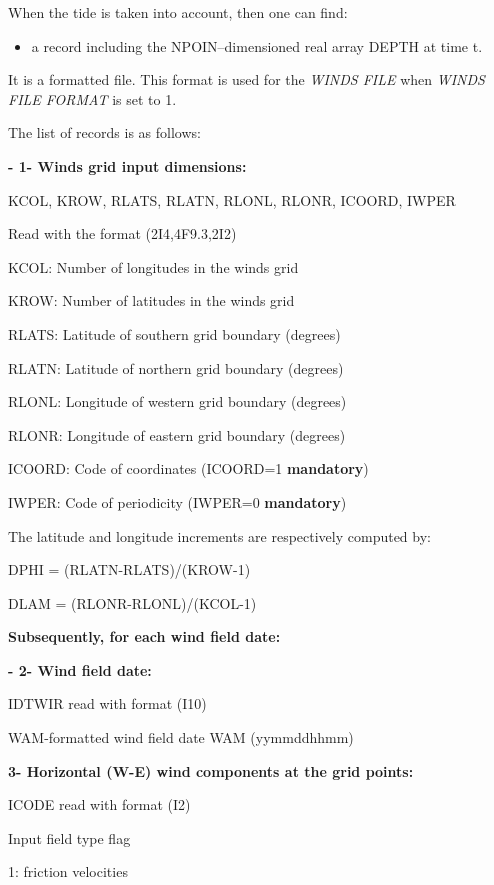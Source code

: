  When the tide is taken into account, then one can find:

\begin{itemize}
\item  a record including the NPOIN--dimensioned real array DEPTH at time t.
\end{itemize}

\underbar{ }\textbf{}

 It is a formatted file. This format is used for the \textit{WINDS FILE} when \textit{WINDS FILE FORMAT} is set to 1.

 The list of records is as follows:

 \textbf{- 1- Winds grid input dimensions:}

 KCOL, KROW, RLATS, RLATN, RLONL, RLONR, ICOORD, IWPER

  Read with the format (2I4,4F9.3,2I2)

  KCOL: Number of longitudes in the winds grid

  KROW: Number of latitudes in the winds grid

  RLATS: Latitude of southern grid boundary (degrees)

  RLATN: Latitude of northern grid boundary (degrees)

  RLONL: Longitude of western grid boundary (degrees)

  RLONR: Longitude of eastern grid boundary (degrees)

  ICOORD: Code of coordinates (ICOORD=1 \textbf{mandatory})

  IWPER: Code of periodicity (IWPER=0 \textbf{mandatory})

 The latitude and longitude increments are respectively computed by:

 DPHI = (RLATN-RLATS)/(KROW-1)

 DLAM = (RLONR-RLONL)/(KCOL-1)

\textbf{ Subsequently, for each wind field date:}

 \textbf{- 2- Wind field date:}

 IDTWIR read with format (I10)

  WAM-formatted wind field date WAM (yymmddhhmm)

 \textbf{ 3- Horizontal (W-E) wind components at the grid points:}

 ICODE read with format (I2)

  Input field type flag

   1: friction velocities

